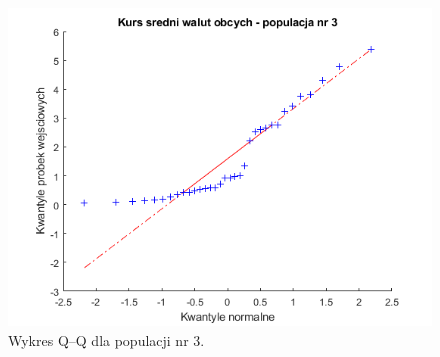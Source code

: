 \documentclass[12pt, a4paper]{article}
\begin{document}
\begin{figure}[H]
\centering
\includegraphics[width=.75\textwidth]{qqplot3.png}
\caption{Wykres Q--Q dla populacji nr 3.}
\label{fig:c63}
\end{figure}
\end{document}
